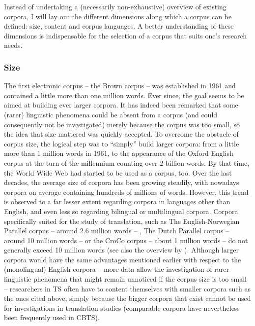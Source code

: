 Instead of undertaking a (necessarily non-exhaustive) overview of existing corpora, I will lay out the different dimensions along which a corpus can be defined: size, content and corpus languages. A better understanding of these dimensions is indispensable for the selection of a corpus that suits one’s research needs.

\subsubsection{Size}
\label{sec:2.2.1.1}  
The first electronic corpus – the Brown corpus – was established in 1961 and contained a little more than one million words. Ever since, the goal seems to be aimed at building ever larger corpora. It has indeed been remarked that some (rarer) linguistic phenomena could be absent from a corpus (and could consequently not be investigated) merely because the corpus was too small, so the idea that size mattered was quickly accepted. To overcome the obstacle of corpus size, the logical step was to ``simply'' build larger corpora: from a little more than 1 million words in 1961, to the appearance of the Oxford English corpus at the turn of the millennium counting over 2 billion words. By that time, the World Wide Web had started to be used as a corpus, too. Over the last decades, the average size of corpora has been growing steadily, with nowadays corpora on average containing hundreds of millions of words. However, this trend is observed to a far lesser extent regarding corpora in languages other than English, and even less so regarding bilingual or multilingual corpora. Corpora specifically suited for the study of translation, such as The English-Norwegian Parallel corpus – around 2.6 million words -- \citep{johansson_role_1998}, The Dutch Parallel corpus -- around 10 million words -- \citep{macken_dutch_2011} or the CroCo corpus – about 1 million words -- \citep{hansen-schirra_towards_2012} do not generally exceed 10 million words (see also the overview by \citealt[26--27]{zanettin_corpus_2013}). Although larger corpora would have the same advantages mentioned earlier with respect to the (monolingual) English corpora – more data allow the investigation of rarer linguistic phenomena that might remain unnoticed if the corpus size is too small – researchers in TS often have to content themselves with smaller corpora such as the ones cited above, simply because the bigger corpora that exist cannot be used for investigations in translation studies (comparable corpora have nevertheless been frequently used in CBTS).

